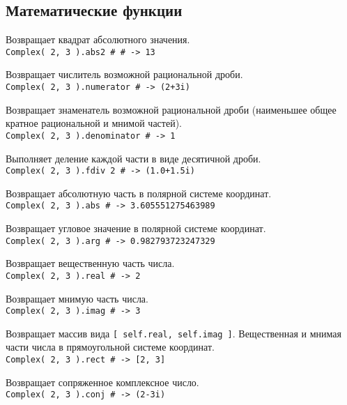 \subsection*{Математические функции}

\begin{methodlist}
  Возвращает квадрат абсолютного значения. 
  \\\verb!Complex( 2, 3 ).abs2 # # -> 13!

  Возвращает числитель возможной рациональной дроби. 
  \\\verb!Complex( 2, 3 ).numerator # -> (2+3i) !
 
  Возвращает знаменатель возможной рациональной дроби (наименьшее общее кратное рациональной и мнимой частей). 
  \\\verb!Complex( 2, 3 ).denominator # -> 1!

  Выполняет деление каждой части в виде десятичной дроби. 
  \\\verb!Complex( 2, 3 ).fdiv 2 # -> (1.0+1.5i)!

  Возвращает абсолютную часть в полярной системе координат. 
  \\\verb!Complex( 2, 3 ).abs # -> 3.605551275463989 !
 
  Возвращает угловое значение в полярной системе координат. 
  \\\verb!Complex( 2, 3 ).arg # -> 0.982793723247329!

  Возвращает вещественную часть числа. 
  \\\verb!Complex( 2, 3 ).real # -> 2 !
 
  Возвращает мнимую часть числа. 
  \\\verb!Complex( 2, 3 ).imag # -> 3 !
 
  Возвращает массив вида \verb![ self.real, self.imag ]!. Вещественная и мнимая части числа в прямоугольной системе координат.
  \\\verb!Complex( 2, 3 ).rect # -> [2, 3] !
 
  Возвращает сопряженное комплексное число. 
  \\\verb!Complex( 2, 3 ).conj # -> (2-3i) !
\end{methodlist}


